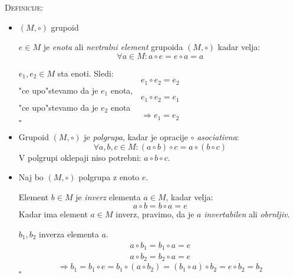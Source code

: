 \textsc{Definicije:}
\begin{itemize}
	\item $(M, \circ)$ grupoid
	
	$e \in M$ je \emph{enota} ali \emph{nevtralni element} grupoida $(M, \circ)$ kadar velja:
	\begin{equation*}
	\forall a \in M: a \circ e = e \circ a = a
	\end{equation*}
	
	
	$e_1, e_2 \in M$ sta enoti. Sledi:
	\begin{equation*}
	e_1 \circ e_2 = e_2
	\end{equation*}
	"ce upo"stevamo da je $e_1$ enota,
	\begin{equation*}
	e_1 \circ e_2 = e_1
	\end{equation*}
	"ce upo"stevamo da je $e_2$ enota
	\begin{equation*}
	\Rightarrow e_1 = e_2
	\end{equation*}
	\hfill $\square$
	
	\item Grupoid $(M, \circ)$ je \emph{polgrupa}, kadar je opracije $\circ$ \emph{asociativna}:
	\begin{equation*}
	\forall a, b, c \in M: (a \circ b) \circ c = a \circ (b \circ c)
	\end{equation*}
	V polgrupi oklepaji niso potrebni: $a \circ b \circ c$.
	
	\item Naj bo $(M, \circ)$ polgrupa z enoto $e$.
	
	Element $b \in M$ je \emph{inverz} elementa $a \in M$, kadar velja:
	\begin{equation*}
	a \circ b = b \circ a = e
	\end{equation*}
	Kadar ima element $a \in M$ inverz, pravimo, da je $a$ \emph{invertabilen} ali \emph{obrnljiv}.
	
	
	$b_1, b_2$ inverza elementa $a$.
	\begin{align*}
	a \circ b_1 = b_1 \circ a = e\\
	a \circ b_2 = b_2 \circ a = e
	\end{align*}
	\begin{equation*}
	\Rightarrow b_1 = b_1 \circ e = b_1 \circ (a \circ b_2) = (b_1 \circ a) \circ b_2 = e \circ b_2 = b_2
	\end{equation*}
	\hfill $\square$
	

\end{itemize}
